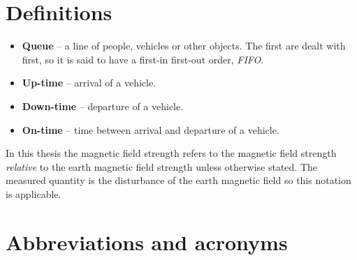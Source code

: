 \cleardoublepage\chapter*{Definitions}\label{chap:definitions}
\begin{itemize}
	\item \textbf{Queue} -- a line of people, vehicles or other objects. The first are dealt with first, so it is said to have a first-in first-out order, \emph{FIFO}.
	\item \textbf{Up-time} -- arrival of a vehicle.
	\item \textbf{Down-time} -- departure of a vehicle.
	\item \textbf{On-time} -- time between arrival and departure of a vehicle.
\end{itemize}

In this thesis the magnetic field strength refers to the magnetic field strength \emph{relative} to the earth magnetic field strength unless otherwise stated. The measured quantity is the disturbance of the earth magnetic field so this notation is applicable.

\cleardoublepage\chapter*{Abbreviations and acronyms}\label{chap:acronyms}

